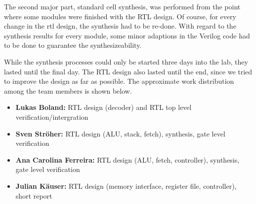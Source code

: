 The second major part, standard cell synthesis, was performed from the point where some modules were finished with the RTL design. Of course, for every change in the rtl design, the synthesis had to be re-done. With regard to the synthesis results for every module, some minor adaptions in the Verilog code had to be done to guarantee the synthesizeability.

While the synthesis processes could only be started three days into the lab, they lasted until the final day. The RTL design also lasted until the end, since we tried to improve the design as far as possible. The approximate work distribution among the team members is shown below.

\begin{itemize}
\item \textbf{Lukas Boland:} RTL design (decoder) and RTL top level verification/intergration
\item \textbf{Sven Str\"oher:} RTL design (ALU, stack, fetch), synthesis, gate level verification
\item \textbf{Ana Carolina Ferreira:} RTL design (ALU, fetch, controller), synthesis, gate level verification
\item \textbf{Julian K\"auser:} RTL design (memory interface, register file, controller), short report
\end{itemize}



